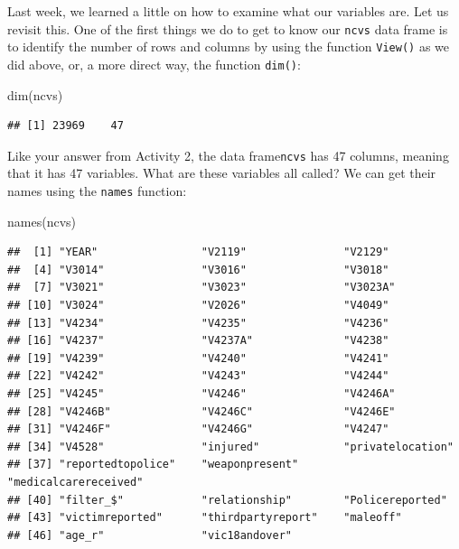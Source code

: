 \documentclass[
]{book}
\newenvironment{Shaded}{\begin{snugshade}}{\end{snugshade}}
\newcommand{\FunctionTok}[1]{\textcolor[rgb]{0.00,0.00,0.00}{#1}}
\newcommand{\NormalTok}[1]{#1}
\begin{document}
Last week, we learned a little on how to examine what our variables are. Let us revisit this. One of the first things we do to get to know our \texttt{ncvs} data frame is to identify the number of rows and columns by using the function \texttt{View()} as we did above, or, a more direct way, the function \texttt{dim()}:

\begin{Shaded}
\begin{Highlighting}[]
\FunctionTok{dim}\NormalTok{(ncvs)}
\end{Highlighting}
\end{Shaded}

\begin{verbatim}
## [1] 23969    47
\end{verbatim}

Like your answer from Activity 2, the data frame\texttt{ncvs} has 47 columns, meaning that it has 47 variables. What are these variables all called? We can get their names using the \texttt{names} function:

\begin{Shaded}
\begin{Highlighting}[]
\FunctionTok{names}\NormalTok{(ncvs)}
\end{Highlighting}
\end{Shaded}

\begin{verbatim}
##  [1] "YEAR"                "V2119"               "V2129"              
##  [4] "V3014"               "V3016"               "V3018"              
##  [7] "V3021"               "V3023"               "V3023A"             
## [10] "V3024"               "V2026"               "V4049"              
## [13] "V4234"               "V4235"               "V4236"              
## [16] "V4237"               "V4237A"              "V4238"              
## [19] "V4239"               "V4240"               "V4241"              
## [22] "V4242"               "V4243"               "V4244"              
## [25] "V4245"               "V4246"               "V4246A"             
## [28] "V4246B"              "V4246C"              "V4246E"             
## [31] "V4246F"              "V4246G"              "V4247"              
## [34] "V4528"               "injured"             "privatelocation"    
## [37] "reportedtopolice"    "weaponpresent"       "medicalcarereceived"
## [40] "filter_$"            "relationship"        "Policereported"     
## [43] "victimreported"      "thirdpartyreport"    "maleoff"            
## [46] "age_r"               "vic18andover"
\end{verbatim}
\end{document}
